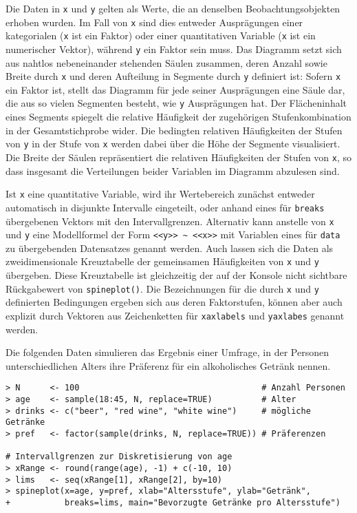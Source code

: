 Die Daten in \lstinline!x! und \lstinline!y! gelten als Werte, die an denselben Beobachtungsobjekten erhoben wurden. Im Fall von \lstinline!x! sind dies entweder Ausprägungen einer kategorialen (\lstinline!x! ist ein Faktor) oder einer quantitativen Variable (\lstinline!x! ist ein numerischer Vektor), während \lstinline!y! ein Faktor sein muss. Das Diagramm setzt sich aus nahtlos nebeneinander stehenden Säulen zusammen, deren Anzahl sowie Breite durch \lstinline!x! und deren Aufteilung in Segmente durch \lstinline!y! definiert ist: Sofern \lstinline!x! ein Faktor ist, stellt das Diagramm für jede seiner Ausprägungen eine Säule dar, die aus so vielen Segmenten besteht, wie \lstinline!y! Ausprägungen hat. Der Flächeninhalt eines Segments spiegelt die relative Häufigkeit der zugehörigen Stufenkombination in der Gesamtstichprobe wider. Die bedingten relativen Häufigkeiten der Stufen von \lstinline!y! in der Stufe von \lstinline!x! werden dabei über die Höhe der Segmente visualisiert. Die Breite der Säulen repräsentiert die relativen Häufigkeiten der Stufen von \lstinline!x!, so dass insgesamt die Verteilungen beider Variablen im Diagramm abzulesen sind.

Ist \lstinline!x! eine quantitative Variable, wird ihr Wertebereich zunächst entweder automatisch in disjunkte Intervalle eingeteilt, oder anhand eines für \lstinline!breaks! übergebenen Vektors mit den Intervallgrenzen. Alternativ kann anstelle von \lstinline!x! und \lstinline!y! eine Modellformel der Form \lstinline!<<y>> ~ <<x>>! mit Variablen eines für \lstinline!data! zu übergebenden Datensatzes genannt werden. Auch lassen sich die Daten als zweidimensionale Kreuztabelle der gemeinsamen Häufigkeiten von \lstinline!x! und \lstinline!y! übergeben. Diese Kreuztabelle ist gleichzeitig der auf der Konsole nicht sichtbare Rückgabewert von \lstinline!spineplot()!. Die Bezeichnungen für die durch \lstinline!x! und \lstinline!y! definierten Bedingungen ergeben sich aus deren Faktorstufen, können aber auch explizit durch Vektoren aus Zeichenketten für \lstinline!xaxlabels! und \lstinline!yaxlabes! genannt werden.

Die folgenden Daten simulieren das Ergebnis einer Umfrage, in der Personen unterschiedlichen Alters ihre Präferenz für ein alkoholisches Getränk nennen.
\begin{lstlisting}
> N      <- 100                                     # Anzahl Personen
> age    <- sample(18:45, N, replace=TRUE)          # Alter
> drinks <- c("beer", "red wine", "white wine")     # mögliche Getränke
> pref   <- factor(sample(drinks, N, replace=TRUE)) # Präferenzen

# Intervallgrenzen zur Diskretisierung von age
> xRange <- round(range(age), -1) + c(-10, 10)
> lims   <- seq(xRange[1], xRange[2], by=10)
> spineplot(x=age, y=pref, xlab="Altersstufe", ylab="Getränk",
+           breaks=lims, main="Bevorzugte Getränke pro Altersstufe")
\end{lstlisting}

